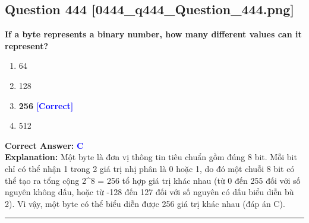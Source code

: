 \documentclass[11pt,a4paper]{article}
\begin{document}
\begin{minipage}{\textwidth}
\subsection*{Question 444 \quad \footnotesize{[0444\_q444\_Question\_444.png]}}
\noindent \textbf{If a byte represents a binary number, how many different values can it represent?}

\begin{enumerate}[label=\Alph*.]
    \item 64
    \item 128
    \item \textbf{256} \hfill \textcolor{blue}{\textbf{[Correct]}}
    \item 512
\end{enumerate}

\noindent \textbf{Correct Answer:} \textcolor{blue}{\textbf{C}} \\[2pt]
\noindent \textbf{Explanation:} Một byte là đơn vị thông tin tiêu chuẩn gồm đúng 8 bit. Mỗi bit chỉ có thể nhận 1 trong 2 giá trị nhị phân là 0 hoặc 1, do đó một chuỗi 8 bit có thể tạo ra tổng cộng 2\textasciicircum{}8 = 256 tổ hợp giá trị khác nhau (từ 0 đến 255 đối với số nguyên không dấu, hoặc từ -128 đến 127 đối với số nguyên có dấu biểu diễn bù 2). Vì vậy, một byte có thể biểu diễn được 256 giá trị khác nhau (đáp án C).

\par\vspace{0.3cm}
\hrule
\vspace{0.3cm}
\end{minipage}
\end{document}
